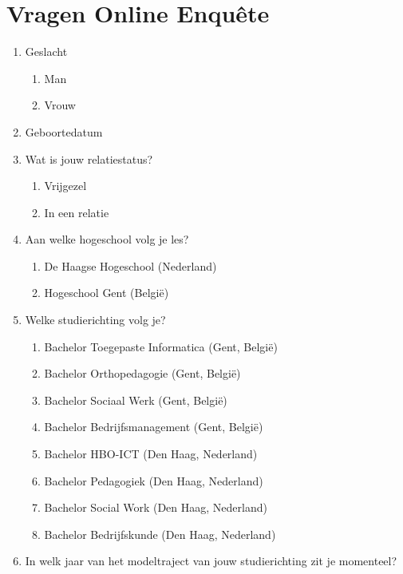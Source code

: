 
\chapter{Vragen Online Enquête}
\label{ch:vragenlijst}

\begin{enumerate}
	\item Geslacht
	\begin{enumerate}
		\item Man
		\item Vrouw
	\end{enumerate}
	\item Geboortedatum
	\item Wat is jouw relatiestatus?
	\begin{enumerate}
		\item Vrijgezel
		\item In een relatie
	\end{enumerate}
	\item Aan welke hogeschool volg je les?
	\begin{enumerate}
		\item De Haagse Hogeschool (Nederland)
		\item Hogeschool Gent (België)
	\end{enumerate}
	\item Welke studierichting volg je?
	\begin{enumerate}
		\item Bachelor Toegepaste Informatica (Gent, België)
		\item Bachelor Orthopedagogie (Gent, België)
		\item Bachelor Sociaal Werk (Gent, België)
		\item Bachelor Bedrijfsmanagement (Gent, België)
		\item Bachelor HBO-ICT (Den Haag, Nederland)
		\item Bachelor Pedagogiek (Den Haag, Nederland)
		\item Bachelor Social Work (Den Haag, Nederland)
		\item Bachelor Bedrijfskunde (Den Haag, Nederland)
	\end{enumerate}
	\item In welk jaar van het modeltraject van jouw studierichting zit je momenteel?
	\begin{enumerate}

\end{enumerate}
\end{enumerate}

